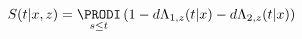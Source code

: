 \documentclass{standalone}
\begin{document}
\nopagecolor

$$ S(t|x,z) = \underset{s\leq t}{\PRODI} \left(1 - d\Lambda_{1,z}(t|x) - d\Lambda_{2,z}(t|x) \right) $$
\end{document}
